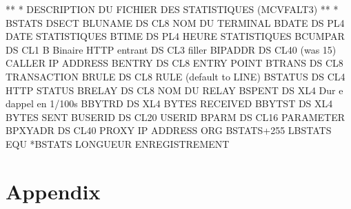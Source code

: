 \documentclass[letterpaper,10pt,english]{sphinxmanual}
\begin{document}
\begin{sphinxVerbatim}[commandchars=\\\{\}]
*\PYGZhy{}\PYGZhy{}\PYGZhy{}\PYGZhy{}\PYGZhy{}\PYGZhy{}\PYGZhy{}\PYGZhy{}\PYGZhy{}\PYGZhy{}\PYGZhy{}\PYGZhy{}\PYGZhy{}\PYGZhy{}\PYGZhy{}\PYGZhy{}\PYGZhy{}\PYGZhy{}\PYGZhy{}\PYGZhy{}\PYGZhy{}\PYGZhy{}\PYGZhy{}\PYGZhy{}\PYGZhy{}\PYGZhy{}\PYGZhy{}\PYGZhy{}\PYGZhy{}\PYGZhy{}\PYGZhy{}\PYGZhy{}\PYGZhy{}\PYGZhy{}\PYGZhy{}\PYGZhy{}\PYGZhy{}\PYGZhy{}\PYGZhy{}\PYGZhy{}\PYGZhy{}\PYGZhy{}\PYGZhy{}\PYGZhy{}\PYGZhy{}\PYGZhy{}\PYGZhy{}\PYGZhy{}\PYGZhy{}\PYGZhy{}\PYGZhy{}\PYGZhy{}\PYGZhy{}\PYGZhy{}\PYGZhy{}\PYGZhy{}\PYGZhy{}\PYGZhy{}\PYGZhy{}\PYGZhy{}*
*        DESCRIPTION DU FICHIER DES STATISTIQUES (MCVFALT3)
*\PYGZhy{}\PYGZhy{}\PYGZhy{}\PYGZhy{}\PYGZhy{}\PYGZhy{}\PYGZhy{}\PYGZhy{}\PYGZhy{}\PYGZhy{}\PYGZhy{}\PYGZhy{}\PYGZhy{}\PYGZhy{}\PYGZhy{}\PYGZhy{}\PYGZhy{}\PYGZhy{}\PYGZhy{}\PYGZhy{}\PYGZhy{}\PYGZhy{}\PYGZhy{}\PYGZhy{}\PYGZhy{}\PYGZhy{}\PYGZhy{}\PYGZhy{}\PYGZhy{}\PYGZhy{}\PYGZhy{}\PYGZhy{}\PYGZhy{}\PYGZhy{}\PYGZhy{}\PYGZhy{}\PYGZhy{}\PYGZhy{}\PYGZhy{}\PYGZhy{}\PYGZhy{}\PYGZhy{}\PYGZhy{}\PYGZhy{}\PYGZhy{}\PYGZhy{}\PYGZhy{}\PYGZhy{}\PYGZhy{}\PYGZhy{}\PYGZhy{}\PYGZhy{}\PYGZhy{}\PYGZhy{}\PYGZhy{}\PYGZhy{}\PYGZhy{}\PYGZhy{}\PYGZhy{}\PYGZhy{}*
*
BSTATS   DSECT
B\PYGZdl{}LUNAME DS    CL8                     NOM DU TERMINAL
B\PYGZdl{}DATE   DS    PL4                     DATE STATISTIQUES
B\PYGZdl{}TIME   DS    PL4                     HEURE STATISTIQUES
B\PYGZdl{}CUMPAR DS    CL1                     B Binaire HTTP entrant
         DS    CL3                     filler
B\PYGZdl{}IPADDR DS    CL40  (was 15)          CALLER IP ADDRESS
B\PYGZdl{}ENTRY  DS    CL8                     ENTRY POINT
B\PYGZdl{}TRANS  DS    CL8                     TRANSACTION
B\PYGZdl{}RULE   DS    CL8                     RULE (default to LINE)
B\PYGZdl{}STATUS DS    CL4                     HTTP STATUS
B\PYGZdl{}RELAY  DS    CL8                     NOM DU RELAY
B\PYGZdl{}SPENT  DS    XL4                     Dur e d\PYGZsq{}appel en 1/100s
B\PYGZdl{}BYTRD  DS    XL4                     BYTES RECEIVED
B\PYGZdl{}BYTST  DS    XL4                     BYTES SENT
B\PYGZdl{}USERID DS    CL20                    USERID
B\PYGZdl{}PARM   DS    CL16                    PARAMETER
B\PYGZdl{}PXYADR DS    CL40                    PROXY IP ADDRESS
        ORG   BSTATS+255
LBSTATS  EQU   *\PYGZhy{}BSTATS                LONGUEUR ENREGISTREMENT
\end{sphinxVerbatim}


\chapter{Appendix}
\label{\detokenize{audit_operations_ and_performance:appendix}}
\end{document}

